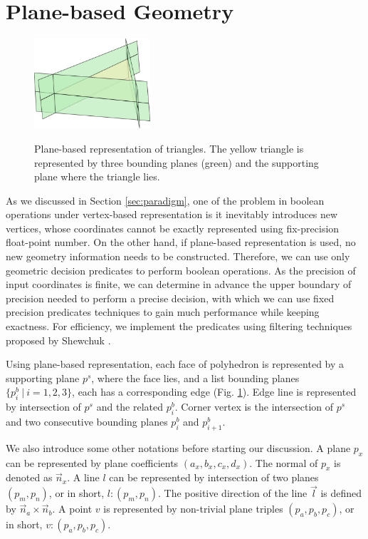 \documentclass[10pt,journal,compsoc]{IEEEtran}
\begin{document}
\section{Plane-based Geometry}

\begin{figure}
  \centering
  \includegraphics[width=1.7in]{p-reps}\\
  \caption{Plane-based representation of triangles. The yellow triangle is represented by three bounding planes (green) and the supporting plane where the triangle lies.}\label{fig:p-reps}
\end{figure}

As we discussed in Section \ref{sec:paradigm}, one of the problem in boolean operations under vertex-based representation is it inevitably introduces new vertices, whose coordinates cannot be exactly represented using fix-precision float-point number. On the other hand, if plane-based representation is used, no new geometry information needs to be constructed. Therefore, we can use only geometric decision predicates to perform boolean operations. As the precision of input coordinates is finite, we can determine in advance the upper boundary of precision needed to perform a precise decision, with which we can use fixed precision predicates techniques to gain much performance while keeping exactness. For efficiency, we implement the predicates using filtering techniques proposed by Shewchuk \cite{shewchuk1997adaptive}.

Using plane-based representation, each face of polyhedron is represented by a supporting plane $p^s$, where the face lies, and a list bounding planes $\{p^b_i \ \vert\  i = 1, 2, 3\}$, each has a corresponding edge (Fig. \ref{fig:p-reps}). Edge line is represented by intersection of $p^s$ and the related $p^b_i$. Corner vertex is the intersection of $p^s$ and two consecutive bounding planes $p^b_i$ and $p^b_{i+1}$.

We also introduce some other notations before starting our discussion. A plane $p_x$ can be represented by plane coefficients $(a_x, b_x, c_x, d_x)$. The normal of $p_x$ is denoted as $\vec{n}_x$. A line $l$ can be represented by intersection of two planes $(p_m, p_n)$, or in short, $l\colon(p_m, p_n)$. The positive direction of the line $\vec{l}$ is defined by $\vec{n}_a \times \vec{n}_b$. A point $v$ is represented by non-trivial plane triples $(p_a, p_b, p_c)$, or in short, $v\colon(p_a, p_b, p_c)$.
\end{document}
